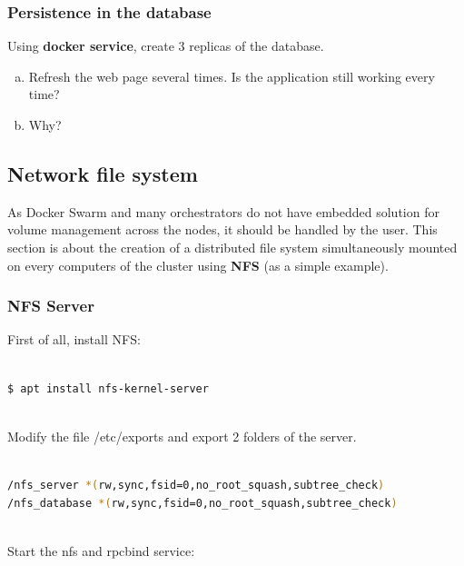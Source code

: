 \documentclass[a4paper,11pt]{exam}
\begin{document}
\subsubsection{Persistence in the database}

\begin{questions}
	\question Using \textbf{docker service}, create 3 replicas of the database.
	\begin{enumerate}[(a)]
		\item Refresh the web page several times. Is the application still working every time?
		\item Why?
	\end{enumerate}
\end{questions}

\clearpage

\subsection{Network file system}

As Docker Swarm and many orchestrators do not have embedded solution for volume management across the nodes, it should be handled by the user.
This section is about the creation of a distributed file system simultaneously mounted on every computers of the cluster using \textbf{NFS} (as a simple example).

\subsubsection{NFS Server}

First of all, install NFS:

\begin{lstlisting}[frame=single,language={sh}]  % Start your code-block

$ apt install nfs-kernel-server
			
\end{lstlisting}

Modify the file /etc/exports and export 2 folders of the server.

\begin{lstlisting}[frame=single,language={sh}]  % Start your code-block

/nfs_server *(rw,sync,fsid=0,no_root_squash,subtree_check)
/nfs_database *(rw,sync,fsid=0,no_root_squash,subtree_check)	
			
\end{lstlisting}

Start the nfs and rpcbind service: 
\end{document}
